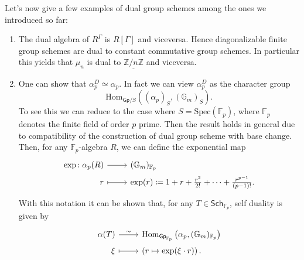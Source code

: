 \noindent
Let's now give a few examples of dual group schemes among the ones we introduced so far:
\begin{ex}[]\leavevmode\vspace{-.2\baselineskip}\label{ex:GroupSchemeDuality}
\begin{enumerate}
	\item The dual algebra of $R^\Gamma$ is $R[\Gamma]$ and viceversa.
		Hence diagonalizable finite group schemes are dual to constant commutative group schemes.
		In particular this yields that $\mu_n$ is dual to $\underline{\mathbb{Z}/n\mathbb{Z}}$
		and viceversa.

	\item One can show that $\alpha_p^D \simeq \alpha_p$.
		In fact we can view $\alpha_p^D$ as the character group
		\begin{equation*}
			\mathrm{Hom}_{\mathsf{Gp}/S} \left( (\alpha_p)_S, (\mathbb{G}_m)_S \right)
		.\end{equation*}
		To see this we can reduce to the case where 
		$S = \mathrm{Spec}(\mathbb{F}_p)$, where
		$\mathbb{F}_{p}$ denotes the finite field of order $p$ prime. Then
		the result holds in general due to compatibility of the construction of
		dual group scheme with base change.
		Then, for any $\mathbb{F}_{p}$-algebra $R$, we can define the exponential map
		\begin{equation*}
		\begin{tikzcd}[row sep = 0ex
			,/tikz/column 1/.append style={anchor=base east}
			,/tikz/column 2/.append style={anchor=base west}]
			\mathrm{exp}\colon \alpha_p(R) \arrow[r, "", rightarrow] &
			(\mathbb{G}_m)_{ \mathbb{F}_{p} } \\
			r \arrow[r, "", mapsto] & \mathrm{exp}(r) \coloneqq
			1 + r + \frac{r^2}{2!} + \cdots + \frac{r^{p-1}}{\left( p-1 \right)!}
		.\end{tikzcd}
		\end{equation*} 
		With this notation it can be shown that, for any
		$T \in \mathsf{Sch}_{ \mathbb{F}_{p} }$, self duality is given by
		\begin{equation*}
		\begin{tikzcd}[row sep = 0ex
			,/tikz/column 1/.append style={anchor=base east}
			,/tikz/column 2/.append style={anchor=base west}]
			\alpha(T) \arrow[r, "\sim", rightarrow] &
			\mathrm{Hom}_{\mathsf{Gp}_{ \mathbb{F}_{p} }}
			\left( \alpha_p, (\mathbb{G}_m)_{\mathbb{F}_{p}} \right) \\
			\xi \arrow[r, "", mapsto] & 
			\left( r \mapsto \mathrm{exp}(\xi \cdot r) \right)
		.\end{tikzcd}
		\end{equation*} 
\end{enumerate}
\end{ex}



